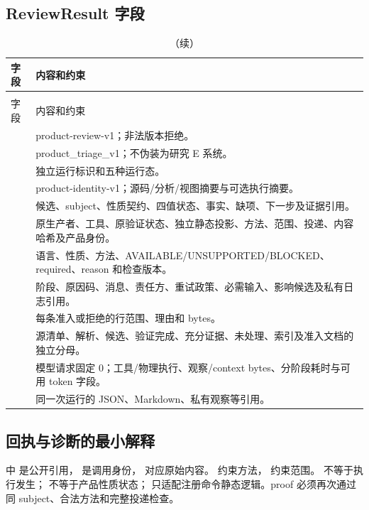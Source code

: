 \subsection{ReviewResult 字段}
\begin{longtable}{L{45mm}L{104mm}}
\caption{公共结果的顶层字段与约束。}\\
\toprule 字段 & 内容和约束\\\midrule\endfirsthead
\caption[]{（续）}\\
\toprule 字段 & 内容和约束\\\midrule\endhead
{} & product-review-v1；非法版本拒绝。\\
 & product\_triage\_v1；不伪装为研究 E 系统。\\
 & 独立运行标识和五种运行态。\\
 & product-identity-v1；源码/分析/视图摘要与可选执行摘要。\\
 & 候选、subject、性质契约、四值状态、事实、缺项、下一步及证据引用。\\
 & 原生产者、工具、原验证状态、独立静态投影、方法、范围、投递、内容哈希及产品身份。\\
 & 语言、性质、方法、AVAILABLE/UNSUPPORTED/BLOCKED、required、reason 和检查版本。\\
 & 阶段、原因码、消息、责任方、重试政策、必需输入、影响候选及私有日志引用。\\
 & 每条准入或拒绝的行范围、理由和 bytes。\\
 & 源清单、解析、候选、验证完成、充分证据、未处理、索引及准入文档的独立分母。\\
 & 模型请求固定 0；工具/物理执行、观察/context bytes、分阶段耗时与可用 token 字段。\\
 & 同一次运行的 JSON、Markdown、私有观察等引用。\\
\bottomrule\end{longtable}

\subsection{回执与诊断的最小解释}
 中  是公开引用， 是调用身份， 对应原始内容。 约束方法， 约束范围。 不等于执行发生； 不等于产品性质状态； 只适配注册命令静态逻辑。proof 必须再次通过同 subject、合法方法和完整投递检查。

